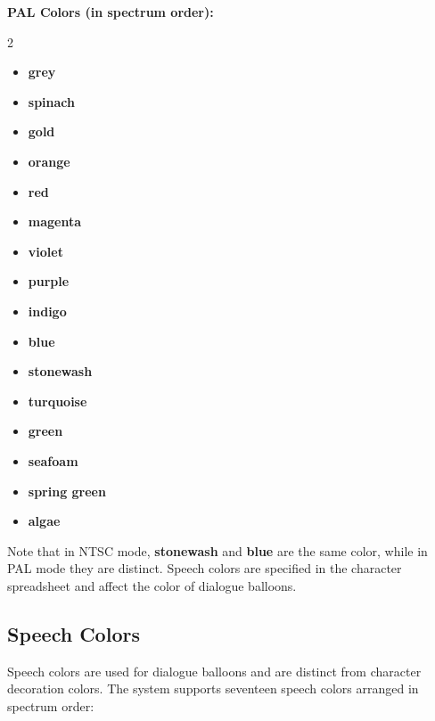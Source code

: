 \documentclass[11pt,letterpaper,oldstylefigures]{memoir}
\newcommand{\paragraphbreak}{\vspace{0.5em}}
\newcommand{\fountain}[1]{\textbf{#1}}
\begin{document}
\textbf{PAL Colors (in spectrum order):}
\begin{multicols}{2}
\begin{itemize}
\item \fountain{grey}
\item \fountain{spinach}
\item \fountain{gold}
\item \fountain{orange}
\item \fountain{red}
\item \fountain{magenta}
\item \fountain{violet}
\item \fountain{purple}
\item \fountain{indigo}
\item \fountain{blue}
\item \fountain{stonewash}
\item \fountain{turquoise}
\item \fountain{green}
\item \fountain{seafoam}
\item \fountain{spring green}
\item \fountain{algae}
\end{itemize}
\end{multicols}

Note that in NTSC mode, \fountain{stonewash} and \fountain{blue} are the same color, while in PAL mode they are distinct. Speech colors are specified in the character spreadsheet and affect the color of dialogue balloons.

\subsection{Speech Colors}
\paragraphbreak

Speech colors are used for dialogue balloons and are distinct from character decoration colors. The system supports seventeen speech colors arranged in spectrum order:
\end{document}

